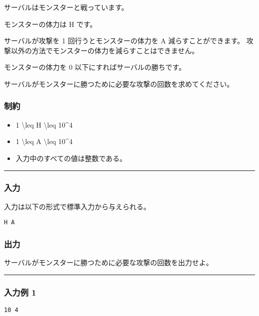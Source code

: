 サーバルはモンスターと戦っています。

モンスターの体力は H です。

サーバルが攻撃を 1 回行うとモンスターの体力を A 減らすことができます。
攻撃以外の方法でモンスターの体力を減らすことはできません。

モンスターの体力を 0 以下にすればサーバルの勝ちです。

サーバルがモンスターに勝つために必要な攻撃の回数を求めてください。

\subsubsection{制約}

\begin{itemize}
\tightlist
\item
  1 \textbackslash leq H \textbackslash leq 10\^{}4
\item
  1 \textbackslash leq A \textbackslash leq 10\^{}4
\item
  入力中のすべての値は整数である。
\end{itemize}

\begin{center}\rule{0.5\linewidth}{\linethickness}\end{center}

\subsubsection{入力}

入力は以下の形式で標準入力から与えられる。

\begin{verbatim}
H A
\end{verbatim}

\subsubsection{出力}

サーバルがモンスターに勝つために必要な攻撃の回数を出力せよ。

\begin{center}\rule{0.5\linewidth}{\linethickness}\end{center}

\subsubsection{入力例 1}

\begin{verbatim}
10 4
\end{verbatim}

